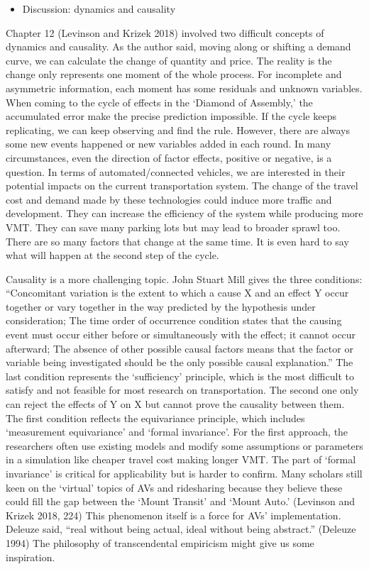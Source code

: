 \documentclass[12pt,]{article}
\providecommand{\tightlist}{%
  \setlength{\itemsep}{0pt}\setlength{\parskip}{0pt}}
\begin{document}
\begin{itemize}
\tightlist
\item
  Discussion: dynamics and causality
\end{itemize}

Chapter 12 (Levinson and Krizek 2018) involved two difficult concepts of
dynamics and causality. As the author said, moving along or shifting a
demand curve, we can calculate the change of quantity and price. The
reality is the change only represents one moment of the whole process.
For incomplete and asymmetric information, each moment has some
residuals and unknown variables. When coming to the cycle of effects in
the `Diamond of Assembly,' the accumulated error make the precise
prediction impossible. If the cycle keeps replicating, we can keep
observing and find the rule. However, there are always some new events
happened or new variables added in each round. In many circumstances,
even the direction of factor effects, positive or negative, is a
question. In terms of automated/connected vehicles, we are interested in
their potential impacts on the current transportation system. The change
of the travel cost and demand made by these technologies could induce
more traffic and development. They can increase the efficiency of the
system while producing more VMT. They can save many parking lots but may
lead to broader sprawl too. There are so many factors that change at the
same time. It is even hard to say what will happen at the second step of
the cycle.

Causality is a more challenging topic. John Stuart Mill gives the three
conditions: ``Concomitant variation is the extent to which a cause X and
an effect Y occur together or vary together in the way predicted by the
hypothesis under consideration; The time order of occurrence condition
states that the causing event must occur either before or simultaneously
with the effect; it cannot occur afterward; The absence of other
possible causal factors means that the factor or variable being
investigated should be the only possible causal explanation.'' The last
condition represents the `sufficiency' principle, which is the most
difficult to satisfy and not feasible for most research on
transportation. The second one only can reject the effects of Y on X but
cannot prove the causality between them. The first condition reflects
the equivariance principle, which includes `measurement equivariance'
and `formal invariance'. For the first approach, the researchers often
use existing models and modify some assumptions or parameters in a
simulation like cheaper travel cost making longer VMT. The part of
`formal invariance' is critical for applicability but is harder to
confirm. Many scholars still keen on the `virtual' topics of AVs and
ridesharing because they believe these could fill the gap between the
`Mount Transit' and `Mount Auto.' (Levinson and Krizek 2018, 224) This
phenomenon itself is a force for AVs' implementation. Deleuze said,
``real without being actual, ideal without being abstract.'' (Deleuze
1994) The philosophy of transcendental empiricism might give us some
inspiration.
\end{document}
